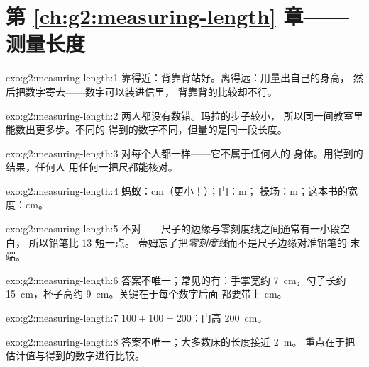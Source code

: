 \section*{第 \ref{ch:g2:measuring-length} 章——测量长度}

\begin{solution}{exo:g2:measuring-length:1}
靠得近：背靠背站好。离得远：用量出自己的身高，
然后把数字寄去——数字可以装进信里，
背靠背的比较却不行。
\end{solution}

\begin{solution}{exo:g2:measuring-length:2}
两人都没有数错。玛拉的步子较小，
所以同一间教室里能数出更多步。不同的
得到的数字不同，但量的是同一段长度。
\end{solution}

\begin{solution}{exo:g2:measuring-length:3}
对每个人都一样——它不属于任何人的
身体。用得到的结果，任何人
用任何一把尺都能核对。
\end{solution}

\begin{solution}{exo:g2:measuring-length:4}
蚂蚁：\unit{cm}（更小！）；门：\unit{m}；
操场：\unit{m}；这本书的宽度：\unit{cm}。
\end{solution}

\begin{solution}{exo:g2:measuring-length:5}
不对——尺子的边缘与零刻度线之间通常有一小段空白，
所以铅笔比 $13$ 短一点。
蒂姆忘了把\emph{零刻度线}而不是尺子边缘对准铅笔的
末端。
\end{solution}

\begin{solution}{exo:g2:measuring-length:6}
答案不唯一；常见的有：手掌宽约 \qty{7}{cm}，勺子长约
\qty{15}{cm}，杯子高约 \qty{9}{cm}。关键在于每个数字后面
都要带上 \unit{cm}。
\end{solution}

\begin{solution}{exo:g2:measuring-length:7}
$100 + 100 = 200$：门高 \qty{200}{cm}。
\end{solution}

\begin{solution}{exo:g2:measuring-length:8}
答案不唯一；大多数床的长度接近 \qty{2}{m}。
重点在于把估计值与得到的数字进行比较。
\end{solution}

